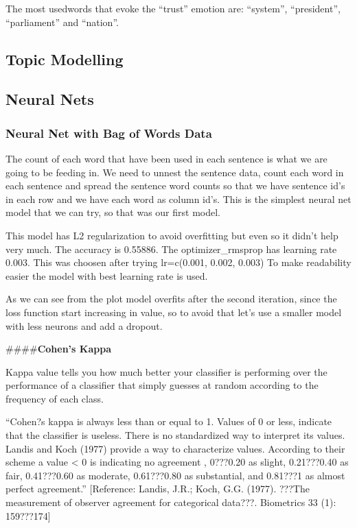 \documentclass[]{article}
\begin{document}
The most usedwords that evoke the ``trust'' emotion are: ``system'',
``president'', ``parliament'' and ``nation''.

\hypertarget{topic-modelling}{%
\subsection{\texorpdfstring{\textbf{Topic
Modelling}}{Topic Modelling}}\label{topic-modelling}}

\hypertarget{neural-nets}{%
\subsection{\texorpdfstring{\textbf{Neural Nets
}}{Neural Nets }}\label{neural-nets}}

\hypertarget{neural-net-with-bag-of-words-data}{%
\subsubsection{\texorpdfstring{\textbf{Neural Net with Bag of Words
Data}}{Neural Net with Bag of Words Data}}\label{neural-net-with-bag-of-words-data}}

The count of each word that have been used in each sentence is what we
are going to be feeding in. We need to unnest the sentence data, count
each word in each sentence and spread the sentence word counts so that
we have sentence id's in each row and we have each word as column id's.
This is the simplest neural net model that we can try, so that was our
first model.

This model has L2 regularization to avoid overfitting but even so it
didn't help very much. The accuracy is 0.55886. The optimizer\_rmsprop
has learning rate 0.003. This was choosen after trying lr=c(0.001,
0.002, 0.003) To make readability easier the model with best learning
rate is used.

As we can see from the plot model overfits after the second iteration,
since the loss function start increasing in value, so to avoid that
let's use a smaller model with less neurons and add a dropout.

\#\#\#\#\textbf{Cohen's Kappa}

Kappa value tells you how much better your classifier is performing over
the performance of a classifier that simply guesses at random according
to the frequency of each class.

``Cohen?s kappa is always less than or equal to 1. Values of 0 or less,
indicate that the classifier is useless. There is no standardized way to
interpret its values. Landis and Koch (1977) provide a way to
characterize values. According to their scheme a value \textless{} 0 is
indicating no agreement , 0???0.20 as slight, 0.21???0.40 as fair,
0.41???0.60 as moderate, 0.61???0.80 as substantial, and 0.81???1 as
almost perfect agreement.'' {[}Reference: Landis, J.R.; Koch, G.G.
(1977). ???The measurement of observer agreement for categorical
data???. Biometrics 33 (1): 159???174{]}
\end{document}
